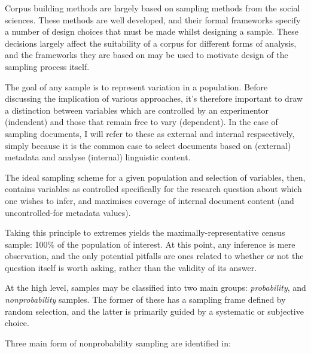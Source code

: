 

Corpus building methods are largely based on sampling methods from the social sciences.  These methods are well developed, and their formal frameworks specify a number of design choices that must be made whilst designing a sample.  These decisions largely affect the suitability of a corpus for different forms of analysis, and the frameworks they are based on may be used to motivate design of the sampling process itself.

The goal of any sample is to represent variation in a population.  Before discussing the implication of various approaches, it's therefore important to draw a distinction between variables which are controlled by an experimentor (indendent) and those that remain free to vary (dependent).  In the case of sampling documents, I will refer to these as external and internal respsectively, simply because it is the common case to select documents based on (external) metadata and analyse (internal) linguistic content.

The ideal sampling scheme for a given population and selection of variables, then, contains variables as controlled specifically for the research question about which one wishes to infer, and maximises coverage of internal document content (and uncontrolled-for metadata values).

Taking this principle to extremes yields the maximally-representative census sample: 100\% of the population of interest.  At this point, any inference is mere observation, and the only potential pitfalls are ones related to whether or not the question itself is worth asking, rather than the validity of its answer.


At the high level, samples may be classified into two main groups: \textsl{probability}, and \textsl{nonprobability} samples.  The former of these has a sampling frame defined by random selection, and the latter is primarily guided by a systematic or subjective choice.


Three main form of nonprobability sampling are identified in\cite{}:

